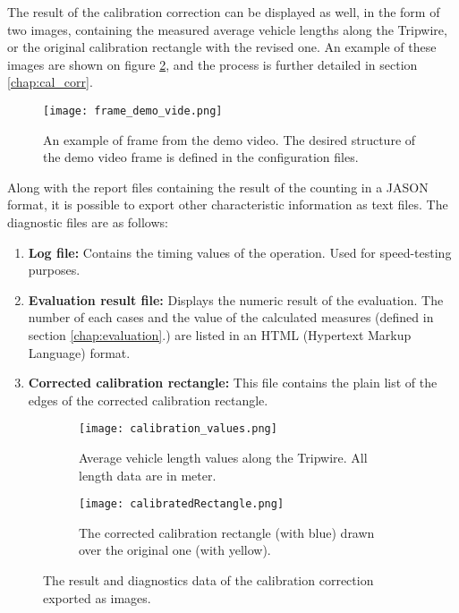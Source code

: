 The result of the calibration correction can be displayed as well, in the form of two images, containing the measured average vehicle lengths along the Tripwire, or the original calibration rectangle with the revised one. 
An example of these images are shown on figure \ref{fig:cal_corr_example}, and the process is further detailed in section \ref{chap:cal_corr}.

\begin{figure}[!h]
	\centering
	\texttt{[image: frame\_demo\_vide.png]}
	\caption{An example of frame from the demo video. The desired structure of the demo video frame is defined in the configuration files.  \label{fig:demo_video}}
\end{figure}

Along with the report files containing the result of the counting in a JASON format, it is possible to export other characteristic information as text files.
The diagnostic files are as follows:
\begin{enumerate}
	\item \textbf{Log file: } Contains the timing values of the operation. Used for speed-testing purposes.
	\item \textbf{Evaluation result file: } Displays the numeric result of the evaluation. The number of each cases and the value of the calculated measures (defined in section \ref{chap:evaluation}.) are listed in an HTML (Hypertext Markup Language) format.
	\item \textbf{Corrected calibration rectangle: } This file contains the plain list of the edges of the corrected calibration rectangle.
\end{enumerate}

\begin{figure}[!h]
	\centering
	\begin{subfigure}[!h]{0.4\textwidth}
		\texttt{[image: calibration\_values.png]}
		\caption{Average vehicle length values along the Tripwire. All length data are in meter.}
	\end{subfigure}
	\quad
	\begin{subfigure}[!h]{0.4\textwidth}
		\texttt{[image: calibratedRectangle.png]}
		\caption{The corrected calibration rectangle (with blue) drawn over the original one (with yellow).}
	\end{subfigure}
	\caption{The result and diagnostics data of the calibration correction exported as images.\label{fig:cal_corr_example}}
\end{figure}


